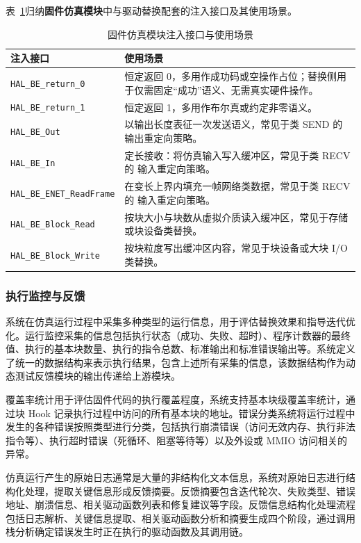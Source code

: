 表~\ref{tab:hal-be-hooks}归纳\textbf{固件仿真模块}中与驱动替换配套的注入接口及其使用场景。

\begin{table}[!htbp]
\centering
\caption{固件仿真模块注入接口与使用场景}
\label{tab:hal-be-hooks}
\small
\setlength{\tabcolsep}{5pt}
\renewcommand{\arraystretch}{1.15}
\begin{tabular}{@{}>{\raggedright\arraybackslash}p{5.05cm}p{7.7cm}@{}}
\toprule
\textbf{注入接口} & \textbf{使用场景} \\
\midrule
\texttt{HAL\_BE\_return\_0} & 恒定返回 0，多用作成功码或空操作占位；替换侧用于仅需固定``成功''语义、无需真实硬件操作。 \\
\texttt{HAL\_BE\_return\_1} & 恒定返回 1，多用作布尔真或约定非零语义。 \\
\texttt{HAL\_BE\_Out} & 以输出长度表征一次发送语义，常见于类 SEND 的 输出重定向策略。 \\
\texttt{HAL\_BE\_In} & 定长接收：将仿真输入写入缓冲区，常见于类 RECV 的 输入重定向策略。 \\
\texttt{HAL\_BE\_ENET\_ReadFrame} & 在变长上界内填充一帧网络类数据，常见于类 RECV 的 输入重定向策略。 \\
\texttt{HAL\_BE\_Block\_Read} & 按块大小与块数从虚拟介质读入缓冲区，常见于存储或块设备类替换。 \\
\texttt{HAL\_BE\_Block\_Write} & 按块粒度写出缓冲区内容，常见于块设备或大块 I/O 类替换。 \\
\bottomrule
\end{tabular}
\end{table}

\subsubsection{执行监控与反馈}

系统在仿真运行过程中采集多种类型的运行信息，用于评估替换效果和指导迭代优化。运行监控采集的信息包括执行状态（成功、失败、超时）、程序计数器的最终值、执行的基本块数量、执行的指令总数、标准输出和标准错误输出等。系统定义了统一的数据结构来表示执行结果，包含上述所有采集的信息，该数据结构作为动态测试反馈模块的输出传递给上游模块。

覆盖率统计用于评估固件代码的执行覆盖程度，系统支持基本块级覆盖率统计，通过块 Hook 记录执行过程中访问的所有基本块的地址。错误分类系统将运行过程中发生的各种错误按照类型进行分类，包括执行崩溃错误（访问无效内存、执行非法指令等）、执行超时错误（死循环、阻塞等待等）以及外设或 MMIO 访问相关的异常。

仿真运行产生的原始日志通常是大量的非结构化文本信息，系统对原始日志进行结构化处理，提取关键信息形成反馈摘要。反馈摘要包含迭代轮次、失败类型、错误地址、崩溃信息、相关驱动函数列表和修复建议等字段。反馈信息结构化处理流程包括日志解析、关键信息提取、相关驱动函数分析和摘要生成四个阶段，通过调用栈分析确定错误发生时正在执行的驱动函数及其调用链。

